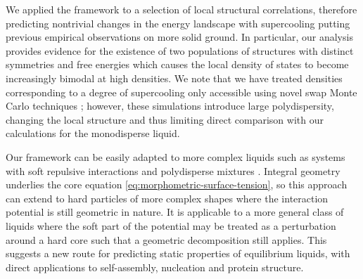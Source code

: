 \documentclass[11pt,twoside]{report}
\begin{document}
We applied the framework to a selection of local structural correlations, therefore predicting nontrivial changes in the energy landscape with supercooling putting previous empirical observations on more solid ground.
In particular, our analysis provides evidence for the existence of two populations of structures with distinct symmetries and free energies which causes the local density of states to become increasingly bimodal at high densities.
We note that we have treated densities corresponding to a degree of supercooling only accessible using novel swap Monte Carlo techniques \cite{BerthierPRL2016}; however, these simulations introduce large polydispersity, changing the local structure \cite{CoslovichJPCM2018} and thus limiting direct comparison with our calculations for the monodisperse liquid.

Our framework can be easily adapted to more complex liquids such as systems with soft repulsive interactions and polydisperse mixtures \cite{KodamaJCP2011}.
Integral geometry underlies the core equation \eqref{eq:morphometric-surface-tension}, so this approach can extend to hard particles of more complex shapes where the interaction potential is still geometric in nature.
It is applicable to a more general class of liquids where the soft part of the potential may be treated as a perturbation around a hard core \cite{Hansen2013} such that a geometric decomposition still applies.
This suggests a new route for predicting static properties of equilibrium liquids, with direct applications to self-assembly, nucleation and protein structure.


\end{document}
